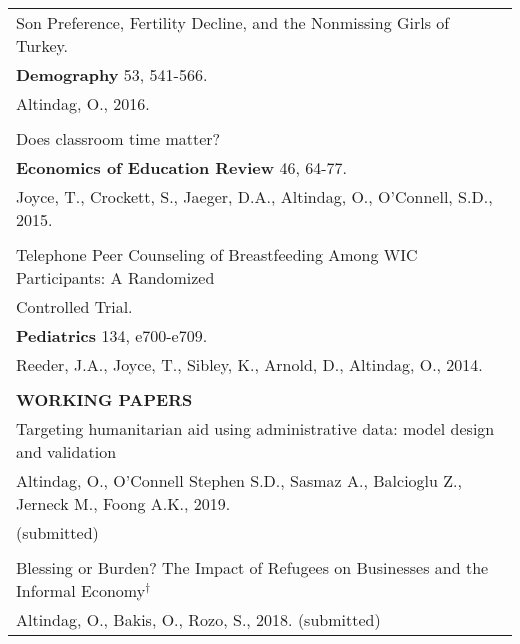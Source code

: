 \documentclass[12 pt]{article}
\begin{document}
\begin{longtable}{ccccc}
 \\

   \multicolumn{5}{l}{Son Preference, Fertility Decline, and the Nonmissing Girls of Turkey.} \\
     \multicolumn{5}{l}{\textbf{Demography}  53, 541-566. } \\
      \multicolumn{5}{l}{Altindag, O., 2016. } \\

\\
   \multicolumn{5}{l}{Does classroom time matter?} \\
     \multicolumn{5}{l}{\textbf{Economics of Education Review} 46, 64-77. } \\
      \multicolumn{5}{l}{Joyce, T., Crockett, S., Jaeger, D.A., Altindag, O., O'Connell, S.D., 2015.} \\

 \\

   \multicolumn{5}{l}{Telephone Peer Counseling of Breastfeeding Among WIC Participants: A Randomized} \\
      \multicolumn{5}{l}{ Controlled Trial.} \\
     \multicolumn{5}{l}{\textbf{Pediatrics} 134, e700-e709. } \\
      \multicolumn{5}{l}{Reeder, J.A., Joyce, T., Sibley, K., Arnold, D., Altindag, O., 2014. } \\


\\


\multicolumn{5}{l}{\textbf{WORKING PAPERS}}\\[2 pt]

 \multicolumn{5}{l}{Targeting humanitarian aid using administrative data: model design and validation} \\ 
  \multicolumn{5}{l}{Altindag, O., O'Connell Stephen S.D., Sasmaz A., Balcioglu Z., Jerneck M., Foong A.K., 2019.} \\
\multicolumn{5}{l}{(submitted)} \\ 
 
\\
  \multicolumn{5}{l}{Blessing or Burden? The Impact of Refugees on Businesses and the Informal Economy$^{\dagger}$} \\

  \multicolumn{5}{l}{Altindag, O., Bakis, O., Rozo, S., 2018. (submitted)} \\
  





\end{longtable}
\end{document}
